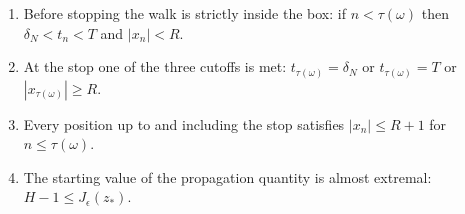 \begin{definition}
\begin{enumerate}
$\omega\mapsto\tau(\omega)$ is $\mu$-integrable.
\item Before stopping the walk is strictly inside the box: if
$n<\tau(\omega)$ then $\delta_N<t_n<T$ and $|x_n|<R$.
\item At the stop one of the three cutoffs is met:
$t_{\tau(\omega)}=\delta_N$ or $t_{\tau(\omega)}=T$ or
$|x_{\tau(\omega)}|\ge R$.
\item Every position up to and including the stop satisfies
$|x_n|\le R+1$ for $n\le\tau(\omega)$.
\item The starting value of the propagation quantity is almost extremal:
$H-1\le J_\epsilon(z_*)$.
\end{enumerate}
\end{definition}
